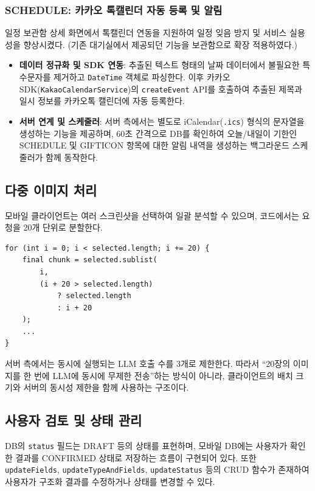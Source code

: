\documentclass[11pt,a4paper]{article}
\begin{document}
\subsubsection{SCHEDULE: 카카오 톡캘린더 자동 등록 및 알림}
일정 보관함 상세 화면에서 톡캘린더 연동을 지원하여 일정 잊음 방지 및 서비스 실용성을 향상시켰다. (기존 대기실에서 제공되던 기능을 보관함으로 확장 적용하였다.)
\begin{itemize}
    \item \textbf{데이터 정규화 및 SDK 연동}: 추출된 텍스트 형태의 날짜 데이터에서 불필요한 특수문자를 제거하고 \texttt{DateTime} 객체로 파싱한다. 이후 카카오 SDK(\texttt{KakaoCalendarService})의 \texttt{createEvent} API를 호출하여 추출된 제목과 일시 정보를 카카오톡 캘린더에 자동 등록한다.
    \item \textbf{서버 연계 및 스케줄러}: 서버 측에서는 별도로 iCalendar(\texttt{.ics}) 형식의 문자열을 생성하는 기능을 제공하며, 60초 간격으로 DB를 확인하여 오늘/내일이 기한인 SCHEDULE 및 GIFTICON 항목에 대한 알림 내역을 생성하는 백그라운드 스케줄러가 함께 동작한다.
\end{itemize}

\subsection{다중 이미지 처리}

모바일 클라이언트는 여러 스크린샷을 선택하여 일괄 분석할 수 있으며, 코드에서는 요청을 20개 단위로 분할한다.

\begin{lstlisting}
for (int i = 0; i < selected.length; i += 20) {
    final chunk = selected.sublist(
        i,
        (i + 20 > selected.length)
            ? selected.length
            : i + 20
    );
    ...
}
\end{lstlisting}

서버 측에서는 동시에 실행되는 LLM 호출 수를 3개로 제한한다. 따라서 ``20장의 이미지를 한 번에 LLM에 동시에 무제한 전송''하는 방식이 아니라, 클라이언트의 배치 크기와 서버의 동시성 제한을 함께 사용하는 구조이다.

\subsection{사용자 검토 및 상태 관리}

DB의 \texttt{status} 필드는 DRAFT 등의 상태를 표현하며, 모바일 DB에는 사용자가 확인한 결과를 CONFIRMED 상태로 저장하는 흐름이 구현되어 있다. 또한 \texttt{updateFields}, \texttt{updateTypeAndFields}, \texttt{updateStatus} 등의 CRUD 함수가 존재하여 사용자가 구조화 결과를 수정하거나 상태를 변경할 수 있다.
\end{document}
